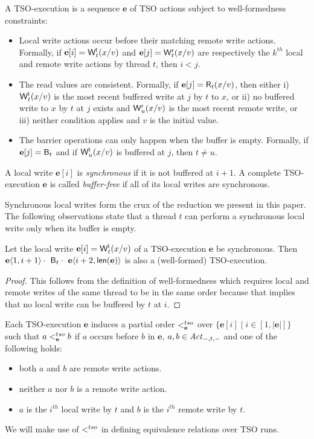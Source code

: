 A TSO-execution is a sequence $\mathbf{e}$ of TSO actions subject to well-formedness constraints:
\begin{itemize}
\item Local write actions occur before their matching remote write actions.
Formally, if $\mathbf{e}[i]=\mathsf{W}^{\mathsf{l}}_{t}(x/v)$ and $\mathbf{e}[j]=\mathsf{W}^{\mathsf{r}}_{t}(x/v)$ are respectively the $k^{th}$ local and remote write actions by thread $t$, then $i<j$.
\item The read values are consistent.
Formally, if $\mathbf{e}[j]=\mathsf{R}_{t}(x/v)$, then either i) $\mathsf{W}^{\mathsf{l}}_{t}(x/v)$ is the most recent buffered write at $j$ by $t$ to $x$, or ii) no buffered write to $x$ by $t$ at $j$ exists and $\mathsf{W}^{\mathsf{r}}_{u}(x/v)$ is the most recent remote write, or iii) neither condition applies and $v$ is the initial value.
\item The barrier operations can only happen when the buffer is empty.
Formally, if $\mathbf{e}[j]=\mathsf{B}_{t}$ and if $\mathsf{W}^{\mathsf{l}}_{u}(x/v)$ is buffered at $j$, then $t\neq u$.
\end{itemize}

\begin{definition}
A local write $\mathbf{e}[i]$ is {\em synchronous} if it is not buffered at $i+1$.
A complete TSO-execution $\mathbf{e}$ is called {\em buffer-free} if all of its local writes are synchronous.
\end{definition}
Synchronous local writes form the crux of the reduction we present in this paper.
The following observations state that a thread $t$ can perform a synchronous local write only when its buffer is empty.
\begin{lemma}\label{lem:synchronous-write}
Let the local write $\mathbf{e}[i]=\mathsf{W}^{\mathsf{l}}_{t}(x/v)$ of a TSO-execution $\mathbf{e}$ be synchronous.
Then $\mathbf{e}\langle 1,i+1\rangle\cdot\ \mathsf{B}_{t}\cdot\ \mathbf{e}\langle i+2,\mathsf{len}(\mathbf{e})\rangle$ is also a (well-formed) TSO-execution.
\end{lemma} 
\begin{proof}
This follows from the definition of well-formedness which requires local and remote writes of the same thread to be in the same order because that implies that no local write can be buffered by $t$ at $i$.
\end{proof}

Each TSO-execution $\mathbf{e}$ induces a partial order $<^{tso}_{\mathbf{e}}$ over $\{\mathbf{e}[i] \mid i\in[1,|\mathbf{e}|]\}$ such that $a<^{tso}_{\mathbf{e}} b$ if $a$ occurs before $b$ in $\mathbf{e}$, $a,b\in\mathit{Act}_{-,t,-}$ and one of the following holds:
\begin{itemize}
\item both $a$ and $b$ are remote write actions.
\item neither $a$ nor $b$ is a remote write action. 
\item $a$ is the $i^{th}$ local write by $t$ and $b$ is the $i^{th}$ remote write by $t$.
\end{itemize}
We will make use of $<^{tso}$ in defining equivalence relations over TSO runs.

